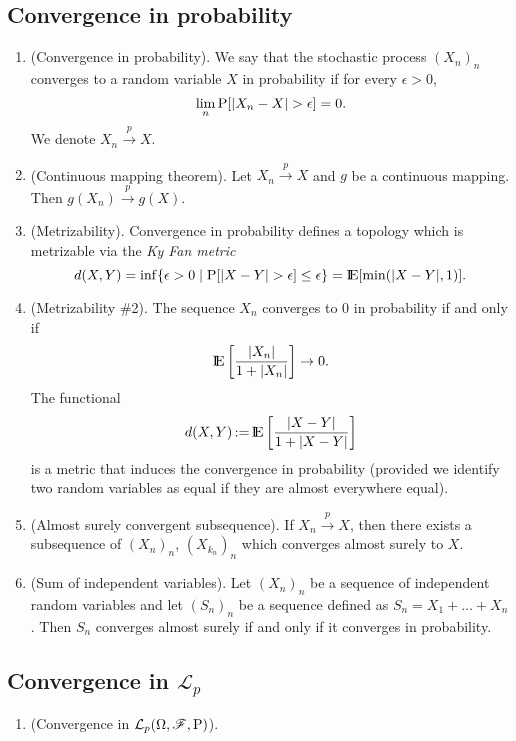 \documentclass[a4paper,10pt]{article}
\begin{document}
\subsection{Convergence in probability}       
\begin{enumerate}
 \item (Convergence in probability). We say that the stochastic process $(X_n)_n$ converges to a random variable $X$
       in probability if for every $\epsilon>0$,
       \[
        \lim_n \prob[|X_n-X|>\epsilon] = 0.
       \]
       We denote $X_n \overset{p}{\to} X$.
 \item (Continuous mapping theorem). Let $X_n \overset{p}{\to} X$ and $g$ be a continuous mapping. Then
       $g(X_n) \overset{p}{\to} g(X)$.
 \item (Metrizability). Convergence in probability defines a topology which is metrizable via the \textit{Ky Fan metric}
      \[
	d(X,Y) = \inf \{\epsilon>0 {}\mid{} \prob[|X-Y|>\epsilon]\leq \epsilon\} = \E[\min(|X-Y|,1)].
      \]
 \item (Metrizability \#2). 
       The sequence $X_n$ converges to $0$ in probability if and only if
       \[
        \E\left[ \frac{|X_n|}{1+|X_n|}\right] \to 0.
       \]
       The functional 
       \[
        d(X,Y) \dfn \E\left[ \frac{|X - Y|}{1+|X - Y|}\right]
       \]
       is a metric that induces the convergence in probability (provided we identify two random variables
       as equal if they are almost everywhere equal).
 \item (Almost surely convergent subsequence). 
       If $X_n \overset{p}{\to} X$, then there exists a subsequence of $(X_n)_n$, 
       $(X_{k_n})_n$ which converges almost surely to $X$.
       
 \item (Sum of independent variables). Let $(X_n)_n$ be a sequence of independent random 
       variables and let $(S_n)_n$ be a sequence defined as $S_n = X_1 + \ldots + X_n$.
       Then $S_n$ converges almost surely if and only if it converges in probability.
\end{enumerate} 
 
\subsection{Convergence in $\mathcal{L}_p$}
\begin{enumerate}
\item (Convergence in $\mathcal{L}_p(\Omega,\mathscr{F},\mathrm{P})$).
\end{enumerate}
\end{document}
